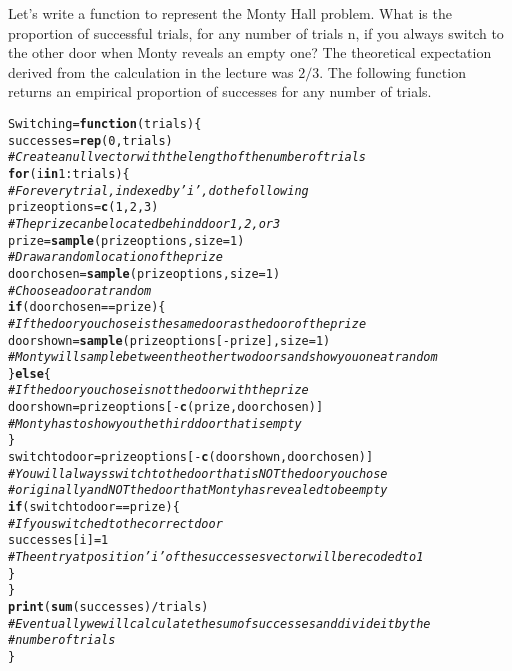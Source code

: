 \documentclass[12pt,letter]{article}\usepackage[]{graphicx}\usepackage[]{color}
\makeatletter
\newcommand{\hlnum}[1]{\textcolor[rgb]{0.686,0.059,0.569}{#1}}%
\newcommand{\hlcom}[1]{\textcolor[rgb]{0.678,0.584,0.686}{\textit{#1}}}%
\newcommand{\hlopt}[1]{\textcolor[rgb]{0,0,0}{#1}}%
\newcommand{\hlstd}[1]{\textcolor[rgb]{0.345,0.345,0.345}{#1}}%
\newcommand{\hlkwa}[1]{\textcolor[rgb]{0.161,0.373,0.58}{\textbf{#1}}}%
\newcommand{\hlkwb}[1]{\textcolor[rgb]{0.69,0.353,0.396}{#1}}%
\newcommand{\hlkwc}[1]{\textcolor[rgb]{0.333,0.667,0.333}{#1}}%
\newcommand{\hlkwd}[1]{\textcolor[rgb]{0.737,0.353,0.396}{\textbf{#1}}}%
\newenvironment{kframe}{%
 \def\at@end@of@kframe{}%
 \ifinner\ifhmode%
  \def\at@end@of@kframe{\end{minipage}}%
  \begin{minipage}{\columnwidth}%
 \fi\fi%
 \def\FrameCommand##1{\hskip\@totalleftmargin \hskip-\fboxsep
 \colorbox{shadecolor}{##1}\hskip-\fboxsep
     \hskip-\linewidth \hskip-\@totalleftmargin \hskip\columnwidth}%
 \MakeFramed {\advance\hsize-\width
   \@totalleftmargin\z@ \linewidth\hsize
   \@setminipage}}%
 {\par\unskip\endMakeFramed%
 \at@end@of@kframe}
\newenvironment{knitrout}{}{} %
\makeatother
\begin{document}
Let's write a function to represent the Monty Hall problem. What is the proportion of successful trials, for any number of trials n, if you always switch to the other door when Monty reveals an empty one? The theoretical expectation derived from the calculation in the lecture was $2/3$. The following function returns an empirical proportion of successes for any number of trials.

\begin{knitrout}
\color{fgcolor}\begin{kframe}
\begin{alltt}
\hlstd{Switching} \hlkwb{=} \hlkwa{function}\hlstd{(}\hlkwc{trials}\hlstd{) \{}
    \hlstd{successes} \hlkwb{=} \hlkwd{rep}\hlstd{(}\hlnum{0}\hlstd{, trials)}
    \hlcom{# Create a null vector with the length of the number of trials}
    \hlkwa{for} \hlstd{(i} \hlkwa{in} \hlnum{1}\hlopt{:}\hlstd{trials) \{}
        \hlcom{# For every trial, indexed by 'i', do the following}
        \hlstd{prizeoptions} \hlkwb{=} \hlkwd{c}\hlstd{(}\hlnum{1}\hlstd{,} \hlnum{2}\hlstd{,} \hlnum{3}\hlstd{)}
        \hlcom{# The prize can be located behind door 1, 2, or 3}
        \hlstd{prize} \hlkwb{=} \hlkwd{sample}\hlstd{(prizeoptions,} \hlkwc{size} \hlstd{=} \hlnum{1}\hlstd{)}
        \hlcom{# Draw a random location of the prize}
        \hlstd{doorchosen} \hlkwb{=} \hlkwd{sample}\hlstd{(prizeoptions,} \hlkwc{size} \hlstd{=} \hlnum{1}\hlstd{)}
        \hlcom{# Choose a door at random}
        \hlkwa{if} \hlstd{(doorchosen} \hlopt{==} \hlstd{prize) \{}
            \hlcom{# If the door you chose is the same door as the door of the prize}
            \hlstd{doorshown} \hlkwb{=} \hlkwd{sample}\hlstd{(prizeoptions[}\hlopt{-}\hlstd{prize],} \hlkwc{size} \hlstd{=} \hlnum{1}\hlstd{)}
            \hlcom{# Monty will sample between the other two doors and show you one at random}
        \hlstd{\}} \hlkwa{else} \hlstd{\{}
            \hlcom{# If the door you chose is not the door with the prize}
            \hlstd{doorshown} \hlkwb{=} \hlstd{prizeoptions[}\hlopt{-}\hlkwd{c}\hlstd{(prize, doorchosen)]}
            \hlcom{# Monty has to show you the third door that is empty}
        \hlstd{\}}
        \hlstd{switchtodoor} \hlkwb{=} \hlstd{prizeoptions[}\hlopt{-}\hlkwd{c}\hlstd{(doorshown, doorchosen)]}
        \hlcom{# You will always switch to the door that is NOT the door you chose}
        \hlcom{# originally and NOT the door that Monty has revealed to be empty}
        \hlkwa{if} \hlstd{(switchtodoor} \hlopt{==} \hlstd{prize) \{}
            \hlcom{# If you switched to the correct door}
            \hlstd{successes[i]} \hlkwb{=} \hlnum{1}
            \hlcom{# The entry at position 'i' of the successes vector will be recoded to 1}
        \hlstd{\}}
    \hlstd{\}}
    \hlkwd{print}\hlstd{(}\hlkwd{sum}\hlstd{(successes)}\hlopt{/}\hlstd{trials)}
    \hlcom{# Eventually we will calculate the sum of successes and divide it by the}
    \hlcom{# number of trials}
\hlstd{\}}


\end{alltt}
\end{kframe}
\end{knitrout}
\end{document}
